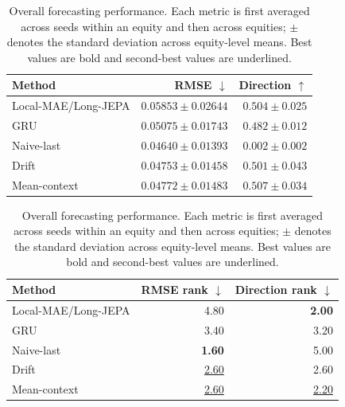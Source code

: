 \begin{table}[t]
\centering
\small
\caption{Overall forecasting performance. Each metric is first averaged across seeds within an equity and then across equities; $\pm$ denotes the standard deviation across equity-level means. Best values are bold and second-best values are underlined.}
\label{tab:main_metrics}
\begin{tabular}{lrr}
\toprule
Method & RMSE $\downarrow$ & Direction $\uparrow$ \\
\midrule
Local-MAE/Long-JEPA & $0.05853 \pm 0.02644$ & \underline{$0.504 \pm 0.025$} \\
GRU & $0.05075 \pm 0.01743$ & $0.482 \pm 0.012$ \\
Naive-last & \textbf{$0.04640 \pm 0.01393$} & $0.002 \pm 0.002$ \\
Drift & \underline{$0.04753 \pm 0.01458$} & $0.501 \pm 0.043$ \\
Mean-context & $0.04772 \pm 0.01483$ & \textbf{$0.507 \pm 0.034$} \\
\bottomrule
\end{tabular}
\par\medskip
\begin{tabular}{lrr}
\toprule
Method & RMSE rank $\downarrow$ & Direction rank $\downarrow$ \\
\midrule
Local-MAE/Long-JEPA & 4.80 & \textbf{2.00} \\
GRU & 3.40 & 3.20 \\
Naive-last & \textbf{1.60} & 5.00 \\
Drift & \underline{2.60} & 2.60 \\
Mean-context & \underline{2.60} & \underline{2.20} \\
\bottomrule
\end{tabular}
\end{table}
